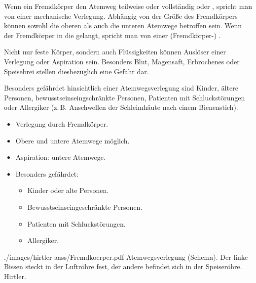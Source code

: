 {%
%
Wenn ein Fremdkörper den Atemweg teilweise oder vollständig  
oder , spricht man von einer mechanische Verlegung. Abhängig von
der Größe des Fremdkörpers können sowohl die oberen als auch die unteren
Atemwege betroffen sein. Wenn der
Fremdkörper in die  gelangt, spricht man von einer
(Fremdkörper-) . 

Nicht nur feste Körper, sondern auch Flüssigkeiten können Auslöser
einer Verlegung oder Aspiration sein. Besonders Blut, Magensaft, Erbrochenes
oder Speisebrei stellen diesbezüglich eine Gefahr dar.

Besonders gefährdet hinsichtlich einer Atemwegsverlegung sind Kinder, ältere
Personen, bewusstseinseingschränkte Personen, Patienten mit Schluckstörungen oder
Allergiker (z.\,B. Anschwellen der Schleimhäute nach einem Bienenstich).

}
{%
\begin{itemize}
  \item Verlegung durch Fremdkörper.
  \item Obere und untere Atemwege möglich.
  \item Aspiration: untere Atemwege.
  \item Besonders gefährdet:
  \begin{itemize}
    \item Kinder oder alte Personen.
    \item Bewusstseinseingeschränkte Personen.
    \item Patienten mit Schluckstörungen.
    \item Allergiker.
  \end{itemize}
\end{itemize}
}
{./images/hirtler-aass/Fremdkoerper.pdf}
{Atemwegsverlegung (Schema). Der linke Bissen steckt in der Luftröhre fest, der
andere befindet sich in der Speiseröhre.}
{Hirtler.}



